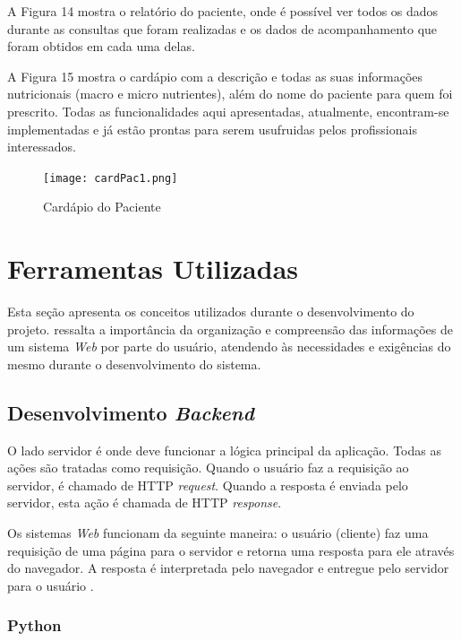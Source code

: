 A Figura 14 mostra o relatório do paciente, onde é possível ver todos os dados
durante as consultas que foram realizadas e os dados de acompanhamento que foram
obtidos em cada uma delas.

A Figura 15 mostra o cardápio com a descrição e todas as suas informações
nutricionais (macro e micro nutrientes), além do nome do paciente para quem foi
prescrito.
Todas as funcionalidades aqui apresentadas, atualmente, encontram-se
implementadas e já estão prontas para serem usufruidas pelos profissionais interessados.

\begin{figure} [hbt]
\begin{center}
\texttt{[image: cardPac1.png]}
\end{center}
\label{cardPac} 
\caption{Cardápio do Paciente}
\end{figure}


\section{Ferramentas Utilizadas} \label{sec:ferramental}

Esta seção apresenta os conceitos utilizados durante o desenvolvimento do projeto.  ressalta a importância da organização e compreensão das informações de um sistema \textit{Web} por parte do usuário, atendendo às necessidades e exigências do mesmo durante o desenvolvimento do sistema.


\subsection{Desenvolvimento \textit{Backend}}

O lado servidor é onde deve funcionar a lógica principal da aplicação. Todas as
ações são tratadas como requisição. Quando o usuário faz a requisição ao servidor,
é chamado de HTTP \textit{request}. Quando a resposta é enviada pelo servidor, esta ação
é chamada de HTTP \textit{response}.

Os sistemas \textit{Web} funcionam da seguinte maneira: o usuário (cliente) faz uma
requisição de uma página para o servidor e retorna uma resposta para ele através do
navegador. A resposta é interpretada pelo navegador e entregue pelo servidor para o
usuário \cite{niederauer}.

\subsubsection{Python}

